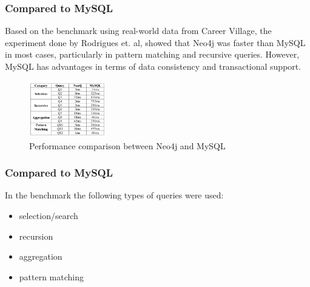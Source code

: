 \documentclass[aspectratio=169]{beamer}
\begin{document}
\begin{frame}
    \frametitle{Compared to MySQL}

    Based on the benchmark using real-world data from Career Village, the experiment done by
    Rodrigues et. al, showed that Neo4j was faster than MySQL in most cases, particularly in
    pattern matching and recursive queries. However, MySQL has advantages in terms of data consistency
    and transactional support. 

    \begin{figure}
        \centering
        \includegraphics[width=0.3\textwidth]{bench1.png}
        \caption{Performance comparison between Neo4j and MySQL }
        \label{fig:mysqlbench}
    \end{figure}
\end{frame}

\begin{frame}
    \frametitle{Compared to MySQL}
    In the benchmark the following types of queries were used:
    \begin{itemize}
        \item selection/search
        \item recursion
        \item aggregation
        \item pattern matching
    \end{itemize}
\end{frame}
\end{document}
